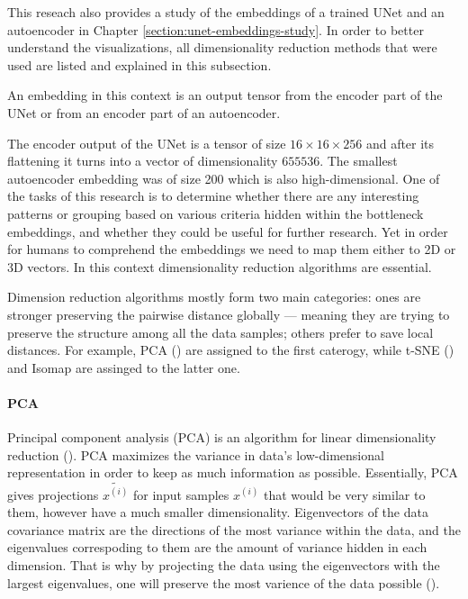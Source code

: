 This reseach also provides a study of the embeddings of a trained UNet and an autoencoder in Chapter \ref{section:unet-embeddings-study}. In order to better understand the visualizations, all dimensionality reduction methods that were used are listed and explained in this subsection.

\begin{definition}[Embedding]
    An embedding in this context is an output tensor from the encoder part of the UNet or from an encoder part of an autoencoder.
\end{definition}

The encoder output of the UNet is a tensor of size $16 \times 16 \times 256$ and after its flattening it turns into a vector of dimensionality $655536$. The smallest autoencoder embedding was of size 200 which is also high-dimensional. One of the tasks of this research is to determine whether there are any interesting patterns or grouping based on various criteria hidden within the bottleneck embeddings, and whether they could be useful for further research. Yet in order for humans to comprehend the embeddings we need to map them either to 2D or 3D vectors. In this context dimensionality reduction algorithms are essential.

Dimension reduction algorithms mostly form two main categories: ones are stronger preserving the pairwise
distance globally --- meaning they are trying to preserve the structure among all the data samples; others prefer to save local distances. For example, PCA (\cite{Hotelling_1933}) are assigned to the first caterogy, while t-SNE (\cite{tsne}) and Isomap are assinged to the latter one.

\paragraph{PCA}
Principal component analysis (PCA) is an algorithm for linear dimensionality reduction (\cite{Pearson_1901}).  PCA maximizes the variance in data's low-dimensional representation in order to keep as much information as possible. Essentially, PCA gives projections $\tilde{x^{(i)}}$ for input samples $x^{(i)}$ that would be very similar to them, however have a much smaller dimensionality. Eigenvectors of the data covariance matrix are the directions of the most variance within the data, and the eigenvalues correspoding to them are the amount of variance hidden in each dimension. That is why by projecting the data using the eigenvectors with the largest eigenvalues, one will preserve the most varience of the data possible (\cite{mml_book}).

